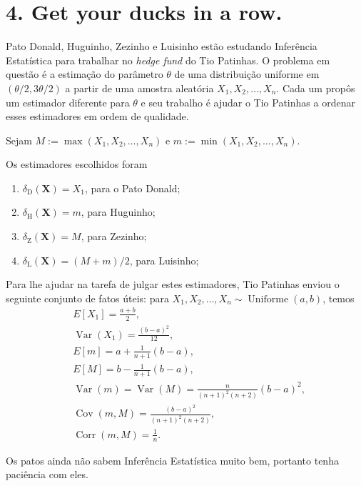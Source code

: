 \documentclass[a4paper,10pt, notitlepage]{report}
\newcommand{\vr}{\operatorname{Var}} %
\newcommand{\rs}{X_1, X_2, \ldots, X_n} %
\newcommand{\bX}{\boldsymbol{X}} %
\begin{document}
\newpage
\section*{4. Get your ducks in a row.}

Pato Donald, Huguinho, Zezinho e Luisinho estão estudando Inferência Estatística para trabalhar no \textit{hedge fund} do Tio Patinhas.
O problema em questão é a estimação do parâmetro $\theta$ de uma distribuição uniforme em $(\theta/2, 3\theta/2)$ a partir de uma amostra aleatória $\rs$.
Cada um propôs um estimador diferente para $\theta$ e seu trabalho é ajudar o Tio Patinhas a ordenar esses estimadores em ordem de qualidade.

Sejam $M := \max\left(\rs \right)$ e $m := \min\left(\rs\right)$.

Os estimadores escolhidos foram
\begin{enumerate}
 \item $\delta_{\text{D}}(\bX) = X_1$, para o Pato Donald;
 \item $\delta_{\text{H}}(\bX) = m$, para Huguinho;
 \item $\delta_{\text{Z}}(\bX) = M$, para Zezinho;
 \item $\delta_{\text{L}}(\bX) = (M+m)/2$, para Luisinho;
\end{enumerate}

Para lhe ajudar na tarefa de julgar estes estimadores, Tio Patinhas enviou o seguinte conjunto de fatos úteis: para $\rs \sim \operatorname{Uniforme}(a, b)$, temos
\begin{align*}
&E[X_1] = \frac{a + b}{2},\\
& \vr(X_1) = \frac{(b-a)^2}{12},\\
&E[m] = a + \frac{1}{n+1}(b-a),\\
&E[M] = b - \frac{1}{n+1}(b-a),\\
&\vr(m) = \vr(M) = \frac{n}{(n+1)^2(n+2)}(b-a)^2,\\
&\operatorname{Cov}\left(m, M\right) = \frac{(b-a)^2}{(n+1)^2(n+2)},\\
&\operatorname{Corr}\left(m, M\right) = \frac{1}{n}.
\end{align*}

Os patos ainda não sabem Inferência Estatística muito bem, portanto tenha paciência com eles.
\end{document}

